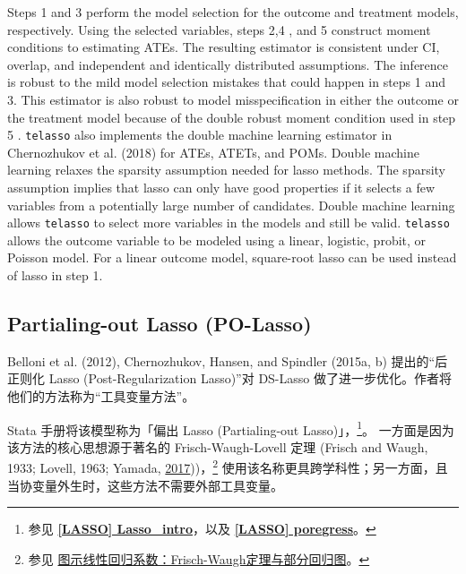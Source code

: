 Steps 1 and 3 perform the model selection for the outcome and treatment models, respectively. Using the selected variables, steps 2,4 , and 5 construct moment conditions to estimating ATEs. The resulting estimator is consistent under CI, overlap, and independent and identically distributed assumptions. The inference is robust to the mild model selection mistakes that could happen in steps 1 and 3. This estimator is also robust to model misspecification in either the outcome or the treatment model because of the double robust moment condition used in step 5 .
\texttt{telasso} also implements the double machine learning estimator in Chernozhukov et al. (2018) for ATEs, ATETs, and POMs. Double machine learning relaxes the sparsity assumption needed for lasso methods. The sparsity assumption implies that lasso can only have good properties if it selects a few variables from a potentially large number of candidates. Double machine learning allows \texttt{telasso} to select more variables in the models and still be valid.
\texttt{telasso} allows the outcome variable to be modeled using a linear, logistic, probit, or Poisson model. For a linear outcome model, square-root lasso can be used instead of lasso in step 1.

\fi      %



\subsection{Partialing-out Lasso (PO-Lasso)}\label{sec:polasso}




Belloni et al. (2012), Chernozhukov, Hansen, and Spindler (2015a, b) 提出的“后正则化 Lasso (Post-Regularization Lasso)”对 DS-Lasso 做了进一步优化。作者将他们的方法称为“工具变量方法”。

Stata 手册将该模型称为「偏出 Lasso (Partialing-out Lasso)」，\footnote{%
   参见 \href{https://www.stata.com/manuals/lassoLasso_intro.pdf}{\bfseries{[\MakeUppercase{lasso}] Lasso\_intro}}，以及 \href{https://www.stata.com/manuals/lassoporegress.pdf}{\bfseries{[\MakeUppercase{lasso}] poregress}}。}。
一方面是因为该方法的核心思想源于著名的 Frisch-Waugh-Lovell 定理 (Frisch and  Waugh, 1933; Lovell, 1963; Yamada, \href{http://dx.doi.org/10.1080/03610926.2016.1252403}{2017}))，\footnote{%
   参见 \href{https://www.lianxh.cn/news/e346db1a68211.html}{图示线性回归系数：Frisch-Waugh定理与部分回归图}。}
使用该名称更具跨学科性；另一方面，且当协变量外生时，这些方法不需要外部工具变量。

